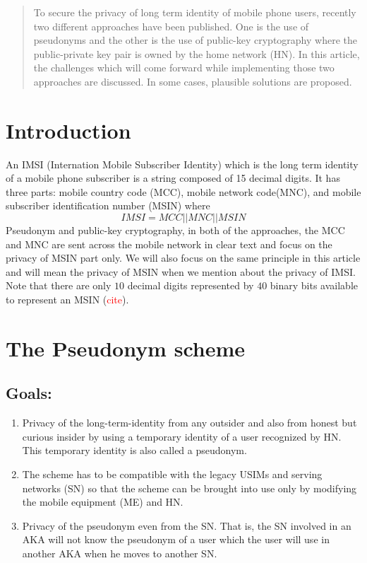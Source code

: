 \documentclass[12pt]{article}
\begin{document}
\maketitle



\begin{abstract}
To secure the privacy of long term identity of mobile phone users, recently two different approaches have been published. One is the use of pseudonyms and the other is the use of public-key cryptography where the public-private key pair is owned by the home network (HN). In this article, the challenges which will come forward while implementing those two approaches are discussed. In some cases, plausible solutions are proposed.
\end{abstract}


\section*{Introduction}
An IMSI (Internation Mobile Subscriber Identity) which is the long term identity of a mobile phone subscriber is a string composed of 15 decimal digits. It has three parts: mobile country code (MCC), mobile network code(MNC), and mobile subscriber identification number (MSIN) where 
$$IMSI = MCC||MNC||MSIN$$ Pseudonym and public-key cryptography, in both of the approaches, the MCC and MNC are sent across the mobile network in clear text and focus on the privacy of MSIN part only. We will also focus on the same principle in this article and will mean the privacy of MSIN when we mention about the privacy of IMSI. Note that there are only $10$ decimal digits represented by $40$ binary bits available to represent an MSIN (\textcolor{red}{cite}).



\section*{The Pseudonym scheme}
\subsection*{Goals:}
\begin{enumerate}
        \item \label{goal_privacy} Privacy of the long-term-identity from any outsider and also from honest but curious insider by using a temporary identity of a user recognized by HN. This temporary identity is also called a pseudonym.
        \item  \label{goal_backward_compatibility} The scheme has to be compatible with the legacy USIMs and serving networks (SN) so that the scheme can be brought into use only by modifying the mobile equipment (ME) and HN.
        \item \label{goal_privacy_sn} Privacy of the pseudonym even from the SN. That is, the SN involved in an AKA will not know the pseudonym of a user which the user will use in another AKA when he moves to another SN.
\end{enumerate}  
\end{document}
